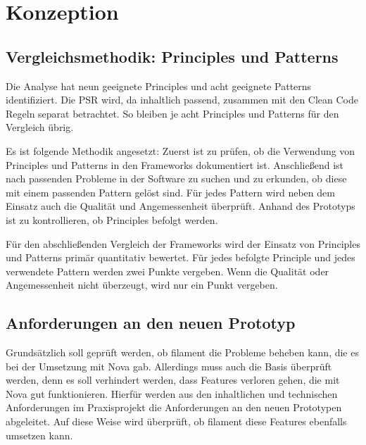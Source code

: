 \newpage

\section{Konzeption}

\subsection{Vergleichsmethodik: Principles und Patterns}
Die Analyse hat neun geeignete Principles und acht geeignete Patterns identifiziert.
Die PSR wird, da inhaltlich passend, zusammen mit den Clean Code Regeln separat betrachtet.
So bleiben je acht Principles und Patterns für den Vergleich übrig.

Es ist folgende Methodik angesetzt:
Zuerst ist zu prüfen, ob die Verwendung von Principles und Patterns in den Frameworks dokumentiert ist.
Anschließend ist nach passenden Probleme in der Software zu suchen und zu erkunden, ob diese mit einem passenden Pattern gelöst sind.
Für jedes Pattern wird neben dem Einsatz auch die Qualität und Angemessenheit überprüft.
Anhand des Prototyps ist zu kontrollieren, ob Principles befolgt werden.

Für den abschließenden Vergleich der Frameworks wird der Einsatz von Principles und Patterns primär quantitativ bewertet.
Für jedes befolgte Principle und jedes verwendete Pattern werden zwei Punkte vergeben.
Wenn die Qualität oder Angemessenheit nicht überzeugt, wird nur ein Punkt vergeben.

\subsection{Anforderungen an den neuen Prototyp}
Grundsätzlich soll geprüft werden, ob filament die Probleme beheben kann, die es bei der Umsetzung mit Nova gab.
Allerdings muss auch die Basis überprüft werden, denn es soll verhindert werden, dass Features verloren gehen, die mit Nova gut funktionieren.
Hierfür werden aus den inhaltlichen und technischen Anforderungen im Praxisprojekt die Anforderungen an den neuen Prototypen abgeleitet.
Auf diese Weise wird überprüft, ob filament diese Features ebenfalls umsetzen kann.

